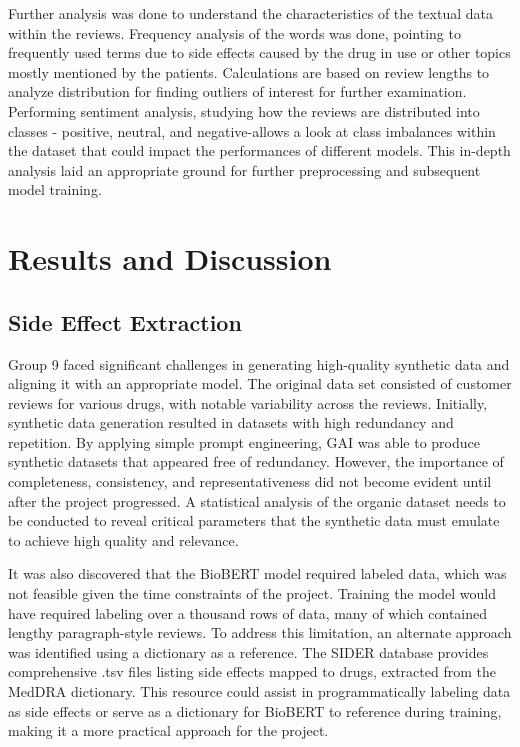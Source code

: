 \documentclass[sigplan,screen]{acmart}
\begin{document}
Further analysis was done to understand the characteristics of the textual data within the reviews. Frequency analysis of the words was done, pointing to frequently used terms due to side effects caused by the drug in use or other topics mostly mentioned by the patients. Calculations are based on review lengths to analyze distribution for finding outliers of interest for further examination. Performing sentiment analysis, studying how the reviews are distributed into classes - positive, neutral, and negative-allows a look at class imbalances within the dataset that could impact the performances of different models. This in-depth analysis laid an appropriate ground for further preprocessing and subsequent model training.

\section{Results and Discussion}

\subsection{Side Effect Extraction}
Group 9 faced significant challenges in generating high-quality synthetic data and aligning it with an appropriate model. The original data set consisted of customer reviews for various drugs, with notable variability across the reviews. Initially, synthetic data generation resulted in datasets with high redundancy and repetition. By applying simple prompt engineering, GAI was able to produce synthetic datasets that appeared free of redundancy. However, the importance of completeness, consistency, and representativeness did not become evident until after the project progressed. A statistical analysis of the organic dataset needs to be conducted to reveal critical parameters that the synthetic data must emulate to achieve high quality and relevance.

It was also discovered that the BioBERT model required labeled data, which was not feasible given the time constraints of the project. Training the model would have required labeling over a thousand rows of data, many of which contained lengthy paragraph-style reviews. To address this limitation, an alternate approach was identified using a dictionary as a reference. The SIDER database provides comprehensive .tsv files listing side effects mapped to drugs, extracted from the MedDRA dictionary. This resource could assist in programmatically labeling data as side effects or serve as a dictionary for BioBERT to reference during training, making it a more practical approach for the project.
\end{document}
